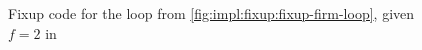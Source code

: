 \begin{figure}[h]
	\begin{adjustbox}{max height=\textheight}
		
	\end{adjustbox}
	\caption{Fixup code for the loop from \cref{fig:impl:fixup:fixup-firm-loop}, given $f = 2$ in \libFIRM}\label{fig:impl:fixup:duff:fixup-firm}
\end{figure}